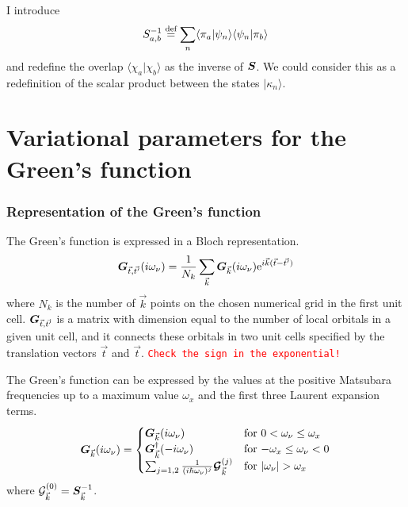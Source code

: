 \documentclass[11pt,a4paper]{report}
\newcommand{\petertt}[1]{\textcolor{red}{\texttt{#1}}}
\begin{document}
I introduce
\begin{eqnarray}
S^{-1}_{a,b}\stackrel{\text{def}}{=} \sum_{n}\langle\pi_a|\psi_n\rangle\langle\psi_n|\pi_b\rangle
\label{eq:defoverlapmatrix}
\end{eqnarray}
and redefine the overlap $\langle\chi_a|\chi_b\rangle$ as the inverse
of $\bm{S}$. We could consider this as a redefinition of the scalar
product between the states $|\kappa_n\rangle$.

\section{Variational parameters for the Green's function}
\subsubsection{Representation of the Green's function}
The Green's function is expressed in a Bloch representation.
\begin{eqnarray}
\bm{G}_{\vec{t},\vec{t'}}(i\omega_\nu)=\frac{1}{N_k}\sum_{\vec{k}}
\bm{G}_{\vec{k}}(i\omega_\nu)\mathrm{e}^{i\vec{k}(\vec{t}-\vec{t'})}
\end{eqnarray}
where $N_k$ is the number of $\vec{k}$ points on the chosen numerical
grid in the first unit cell.  $\bm{G}_{\vec{t},\vec{t'}}$ is a matrix
with dimension equal to the number of local orbitals in a given unit
cell, and it connects these orbitals in two unit cells specified by
the translation vectors $\vec{t}$ and $\vec{t}$.  \petertt{Check the
  sign in the exponential!}


The Green's function can be expressed by the values at the positive
Matsubara frequencies up to a maximum value $\omega_x$ and the first
three Laurent expansion terms.
\begin{eqnarray}
\mat{G}_{\vec{k}}(i\omega_\nu)=
\begin{cases}
\mat{G}_{\vec{k}}(i\omega_\nu)
&\text{for $0<\omega_\nu\le\omega_x$}\\
\mat{G}_{\vec{k}}^\dagger(-i\omega_\nu)
&\text{for $-\omega_x\le\omega_\nu<0$}\\
\sum_{j=1,2}\frac{1}{(i\hbar\omega_\nu)^j}
\mat{\mathcal{G}}^{(j)}_{\vec{k}}
&\text{for $|\omega_\nu|>\omega_x$}\\
\end{cases}
\label{eq:Greensfunctionrep}
\end{eqnarray}
where $\mathcal{\bm{G}}^{(0)}_{\vec{k}}=\bm{S}_{\vec{k}}^{-1}$.
\end{document}
